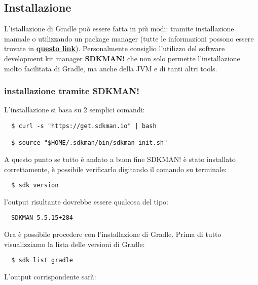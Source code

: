 \subsection{Installazione}
L'istallazione di Gradle può essere fatta in più modi: tramite installazione manuale o utilizzando un package manager (tutte le informazioni possono essere trovate in \textbf{\href{https://gradle.org/install/}{questo link}}). Personalmente consiglio l'utilizzo del software development kit manager \textbf{\href{http://sdkman.io/}{SDKMAN!}} che non solo permette l'installazione molto facilitata di Gradle, ma anche della JVM e di tanti altri tools.

\subsubsection{installazione tramite SDKMAN!}
L'installazione si basa su 2 semplici comandi:
\begin{verbatim}
  $ curl -s "https://get.sdkman.io" | bash
  
  $ source "$HOME/.sdkman/bin/sdkman-init.sh" \end{verbatim}
A questo punto se tutto è andato a buon fine SDKMAN! è stato installato correttamente, è possibile verificarlo digitando il comando su terminale:
\begin{verbatim}
  $ sdk version \end{verbatim}
l'output risultante dovrebbe essere qualcosa del tipo:
\begin{verbatim}
  SDKMAN 5.5.15+284 \end{verbatim}
Ora è possibile procedere con l'installazione di Gradle. Prima di tutto visualizziamo la lista delle versioni di Gradle:
\begin{verbatim}
  $ sdk list gradle \end{verbatim}
L'output corrispondente sarà:
